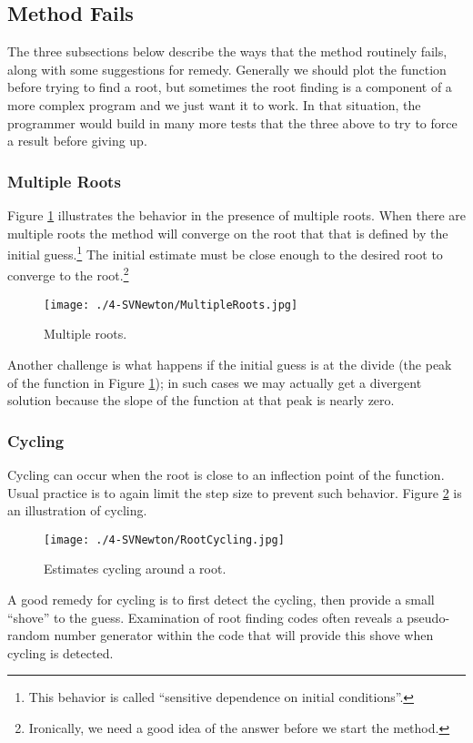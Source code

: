 \subsection{Method Fails}
The three subsections below describe the ways that the method routinely fails, along with some suggestions for remedy.   Generally we should plot the function before trying to find a root, but sometimes the root finding is a component of a more complex program and we just want it to work.   In that situation, the programmer would build in many more tests that the three above to try to force a result before giving up.   
\subsubsection{Multiple Roots}
Figure \ref{fig:MultipleRoots} illustrates the behavior in the presence of multiple roots.  
When there are multiple roots the method will converge on the root that that is defined by the initial guess.\footnote{This behavior is called ``sensitive dependence on initial conditions''.}  
The initial estimate must be close enough to the desired root to converge to the root.\footnote{Ironically, we need a good idea of the answer before we start the method.}
\begin{figure}[h!] %
   \centering
   \texttt{[image: ./4-SVNewton/MultipleRoots.jpg]} 
   \caption{Multiple roots.}
   \label{fig:MultipleRoots}
\end{figure}
Another challenge is what happens if the initial guess is at the divide (the peak of the function in Figure \ref{fig:MultipleRoots}); in such cases we may actually get a divergent solution because the slope of the function at that peak is nearly zero.  
\subsubsection{Cycling}
Cycling can occur when the root is close to an inflection point of the function.  
Usual practice is to again limit the step size to prevent such behavior.  
Figure \ref{fig:RootCycling} is an illustration of cycling.
\begin{figure}[h!] %
   \centering
   \texttt{[image: ./4-SVNewton/RootCycling.jpg]} 
   \caption{Estimates cycling around a root.}
   \label{fig:RootCycling}
\end{figure}
A good remedy for cycling is to first detect the cycling, then provide a small ``shove'' to the guess.  
Examination of root finding codes often reveals a pseudo-random number generator within the code that will provide this shove when cycling is detected.
